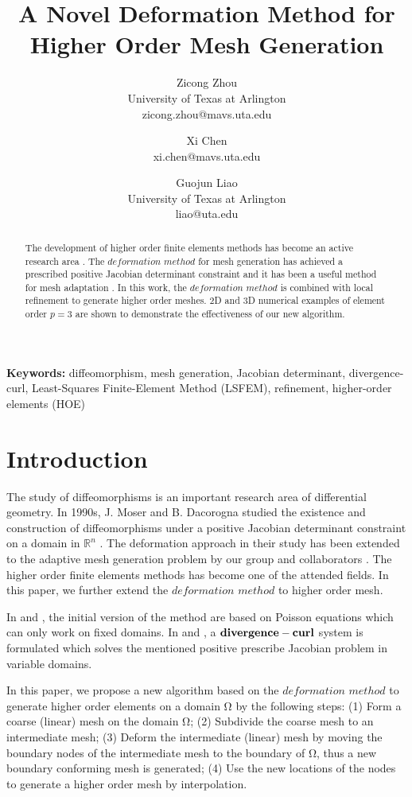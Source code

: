 \documentclass{article}
\title{
A Novel Deformation Method for Higher Order Mesh Generation
}
\author{Zicong Zhou\\
University of Texas at Arlington\\
zicong.zhou@mavs.uta.edu
\and
Xi Chen\\
xi.chen@mavs.uta.edu 
\and 
Guojun Liao\\
University of Texas at Arlington\\
liao@uta.edu
}
\theoremstyle{definition}
\theoremstyle{remark}
\numberwithin{equation}{section}
\numberwithin{subsection}{section}
\begin{document}
\maketitle    
\begin{abstract}
The development of higher order finite elements methods has become an active research area \cite{Solin}. The $deformation$ $method$ for mesh generation has achieved a prescribed positive Jacobian determinant constraint \cite{Ands} \cite{Pan} and it has been a useful method for mesh adaptation \cite{Liu} \cite{Liseikin} \cite{turek}. In this work, the $deformation$ $method$ is combined with local refinement to generate higher order meshes. 2D and 3D numerical examples of element order $p=3$ are shown to demonstrate the effectiveness of our new algorithm.
\end{abstract}
{\bf Keywords:} diffeomorphism, mesh generation, Jacobian determinant, divergence-curl, Least-Squares Finite-Element Method (LSFEM), refinement, higher-order elements (HOE) 

%
\section{Introduction}
%
The study of diffeomorphisms is an important research area of differential geometry. In 1990s, J. Moser and B. Dacorogna studied the existence and construction of diffeomorphisms under a positive Jacobian determinant constraint on a domain in $\mathbb R^n$ \cite{Dac:Mos}. The deformation approach in their study has been extended to the adaptive mesh generation problem by our group and collaborators \cite{Liu}. The higher order finite elements methods has become one of the attended fields. In this paper, we further extend the $deformation$ $method$ to higher order mesh. 

In \cite{Pan} and \cite{Liu}, the initial version of the method are based on Poisson equations which can only work on fixed domains. In \cite{Cai} and  \cite{Dion}, a $\bf{divergence-curl}$ system is formulated which solves the mentioned positive prescribe Jacobian problem in variable domains. 

In this paper, we propose a new algorithm based on the $deformation$ $method$ to generate higher order elements on a domain $\mathrm{\Omega}$ by the following steps: (1) Form a coarse (linear) mesh on the domain $\mathrm{\Omega}$; (2) Subdivide the coarse mesh to an intermediate mesh; (3) Deform the intermediate (linear) mesh by moving the boundary nodes of the intermediate mesh to the boundary of $\mathrm{\Omega}$, thus a new boundary conforming mesh is generated; (4) Use the new locations of the nodes to generate a higher order mesh by interpolation. 
\end{document}
